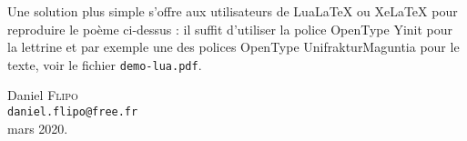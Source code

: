 \documentclass[paper=a4,12pt,german,french]{scrartcl}
\newcommand*{\file}[1]{\texttt{#1}}
\begin{document}
\vspace{.5\baselineskip}
Une solution plus simple s’offre aux utilisateurs de LuaLaTeX ou XeLaTeX pour
reproduire le poème ci-dessus : il suffit d’utiliser la police OpenType Yinit
pour la lettrine et par exemple une des polices OpenType UnifrakturMaguntia
pour le texte, voir le fichier \file{demo-lua.pdf}.

\vfill
\begin{flushright}
  Daniel \textsc{Flipo}\\
  \texttt{daniel.flipo@free.fr}\\
  mars 2020.
\end{flushright}
\end{document}
